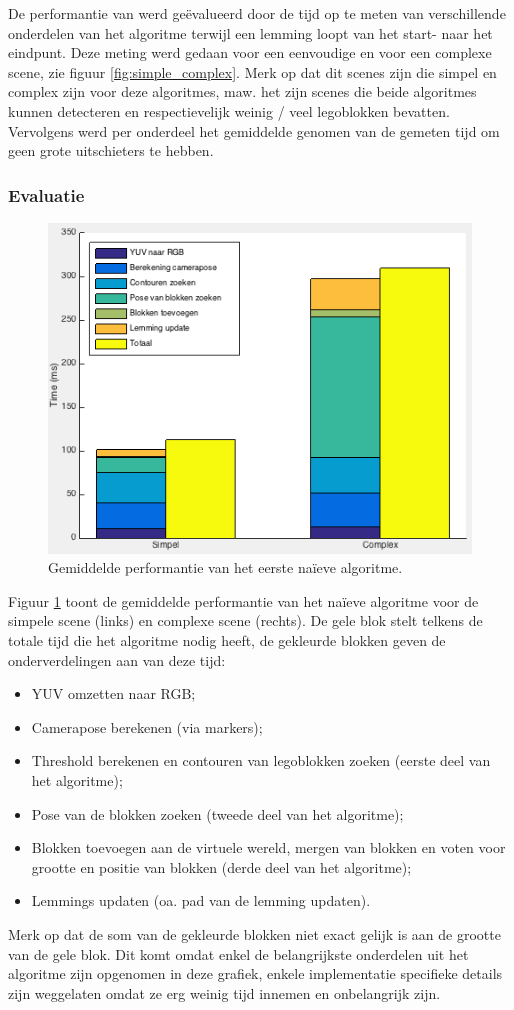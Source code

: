 De performantie van werd ge\"evalueerd door de tijd op te meten van verschillende onderdelen van het algoritme terwijl een lemming loopt van het start- naar het eindpunt. Deze meting werd gedaan voor een eenvoudige en voor een complexe scene, zie figuur \ref{fig:simple_complex}. Merk op dat dit scenes zijn die simpel en complex zijn voor deze algoritmes, maw. het zijn scenes die beide algoritmes kunnen detecteren en respectievelijk weinig / veel legoblokken bevatten. Vervolgens werd per onderdeel het gemiddelde genomen van de gemeten tijd om geen grote uitschieters te hebben.

\subsubsection*{Evaluatie}

\begin{figure}
  \centering
  \includegraphics[width=.75\linewidth]{img/naivePerf}
  \caption{Gemiddelde performantie van het eerste na\"ieve algoritme.}
  \label{fig:perf_algo1}
\end{figure}

Figuur \ref{fig:perf_algo1} toont de gemiddelde performantie van het na\"ieve algoritme voor de simpele scene (links) en complexe scene (rechts). De gele blok stelt telkens de totale tijd die het algoritme nodig heeft, de gekleurde blokken geven de onderverdelingen aan van deze tijd: 
\begin{itemize}
\item YUV omzetten naar RGB;
\item Camerapose berekenen (via markers);
\item Threshold berekenen en contouren van legoblokken zoeken (eerste deel van het algoritme);
\item Pose van de blokken zoeken (tweede deel van het algoritme);
\item Blokken toevoegen aan de virtuele wereld, mergen van blokken en voten voor grootte en positie van blokken (derde deel van het algoritme);
\item Lemmings updaten (oa. pad van de lemming updaten).
\end{itemize}
Merk op dat de som van de gekleurde blokken niet exact gelijk is aan de grootte van de gele blok. Dit komt omdat enkel de belangrijkste onderdelen uit het algoritme zijn opgenomen in deze grafiek, enkele implementatie specifieke details zijn weggelaten omdat ze erg weinig tijd innemen en onbelangrijk zijn.

